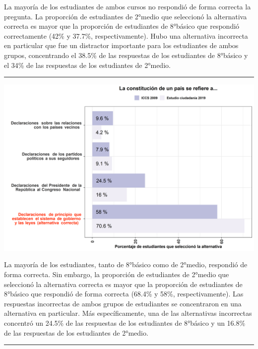 \documentclass[
  14pt,
]{book}
\let\origfigure\figure
\let\endorigfigure\endfigure
\renewenvironment{figure}[1][2] {
  \expandafter\origfigure\expandafter[H]
} {
  \endorigfigure
}
\begin{document}
La mayoría de los estudiantes de ambos cursos no respondió de forma correcta la pregunta. La proporción de estudiantes de 2°medio que seleccionó la alternativa correcta es mayor que la proporción de estudiantes de 8°básico que respondió correctamente (42\% y 37.7\%, respectivamente). Hubo una alternativa incorrecta en particular que fue un distractor importante para los estudiantes de ambos grupos, concentrando el 38.5\% de las respuestas de los estudiantes de 8°básico y el 34\% de las respuestas de los estudiantes de 2°medio.

\begin{center}\rule{0.5\linewidth}{0.5pt}\end{center}

\begin{figure}[!ht]

{\centering \includegraphics[width=0.8\linewidth,]{images/graph_p2} 

}

\caption{Comparación con ICCS: Definiciones de constitución}\label{fig:unnamed-chunk-20}
\end{figure}

La mayoría de los estudiantes, tanto de 8°básico como de 2°medio, respondió de forma correcta. Sin embargo, la proporción de estudiantes de 2°medio que seleccionó la alternativa correcta es mayor que la proporción de estudiantes de 8°básico que respondió de forma correcta (68.4\% y 58\%, respectivamente). Las respuestas incorrectas de ambos grupos de estudiantes se concentraron en una alternativa en particular. Más específicamente, una de las alternativas incorrectas concentró un 24.5\% de las respuestas de los estudiantes de 8°básico y un 16.8\% de las respuestas de los estudiantes de 2°medio.

\begin{center}\rule{0.5\linewidth}{0.5pt}\end{center}
\end{document}
